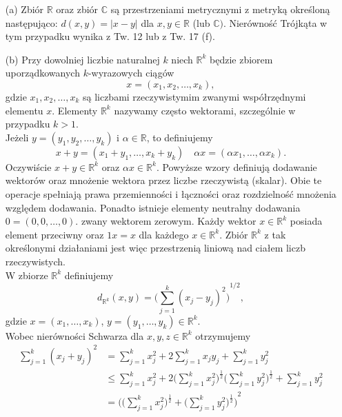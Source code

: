 \documentclass[leqno]{article}
\newcounter{excounter}
\begin{document}
\begin{justify}
\setcounter{excounter}{47}
\begin{ex}
    \begin{itemize}
        \item [(a)] Zbiór $\mathbb{R}$ oraz zbiór $\mathbb{C}$ są przestrzeniami metrycznymi z metryką określoną następująco:
        $d(x, y) = |x - y|$ dla $x, y \in \mathbb{R}$ (lub $\mathbb{C})$. Nierówność Trójkąta w tym przypadku wynika z Tw. 12 lub z Tw. 17 (f).
        \item [(b)] Przy dowolniej liczbie naturalnej $k$ niech $\mathbb{R}^k$ będzie zbiorem uporządkowanych $k$-wyrazowych ciągów
        \[
            x = (x_1, x_2, \ldots, x_k),
        \]
        gdzie $x_1, x_2, \ldots, x_k$ są liczbami rzeczywistymim zwanymi współrzędnymi elementu $x$.
        Elementy $\mathbb{R}^k$ nazywamy często wektorami, szczególnie w przypadku $k > 1$. \\
        Jeżeli $y = (y_1, y_2, \ldots, y_k)$ i $\alpha \in \mathbb{R}$, to definiujemy
        \[
            x + y = (x_1 + y_1, \ldots, x_k + y_k) \quad \alpha x = (\alpha x_1, \ldots, \alpha x_k).
        \]
        Oczywiście $x + y \in \mathbb{R}^k$ oraz $\alpha x \in \mathbb{R}^k$. Powyższe wzory definiują dodawanie wektorów oraz mnożenie
        wektora przez liczbe rzeczywistą (skalar). Obie te operacje spełniają prawa przemienności i łączności oraz rozdzielność mnożenia względem dodawania. 
        Ponadto istnieje elementy neutralny dodawania $0 = (0, 0, \ldots, 0)$. zwany wektorem zerowym. Każdy wektor $x \in \mathbb{R}^k$ posiada element przeciwny oraz $1x = x$
        dla każdego $x \in \mathbb{R}^k$. Zbiór $\mathbb{R}^k$ z tak określonymi działaniami jest więc przestrzenią liniową nad ciałem liczb rzeczywistych. \\
        W zbiorze $\mathbb{R}^k$ definiujemy 
        \[
            d_{\mathbb{R}^k}(x, y) = {\Bigg( \sum_{j=1}^{k}{(x_j - y_j)}^2\Bigg)}^{1/2},
        \]
        gdzie $x = (x_1, \ldots, x_k)$, $y = (y_1, \ldots, y_k) \in \mathbb{R}^k$. \\
        Wobec nierówności Schwarza dla $x, y, z \in \mathbb{R}^k$ otrzymujemy
        \begin{align*}
            \sum_{j=1}^{k}{(x_j + y_j)}^2 &= \sum_{j=1}^{k}x_j^2 + 2 \sum_{j=1}^{k}x_j y_j + \sum_{j=1}^{k}y_j^2 \\
            &\leqslant \sum_{j=1}^{k}x_j^2 + 2\Bigg( \sum_{j=1}^{k}x_j^2\Bigg)^{\frac{1}{2}}\Bigg( \sum_{j=1}^{k}y_j^2\Bigg)^{\frac{1}{2}} + \sum_{j=1}^{k}y_j^2 \\
            &= {\Bigg(\Big(\sum_{j=1}^{k}x_j^2\Big)^{\frac{1}{2}} + \Big(\sum_{j=1}^{k}y_j^2\Big)^{\frac{1}{2}}\Bigg)}^2

\end{align*}
\end{itemize}
\end{ex}
\end{justify}
\end{document}
